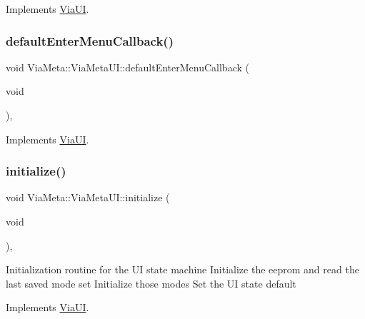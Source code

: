 Implements \mbox{\hyperlink{class_via_u_i_a8a6bf29d336faa8e9d026a84be45d956}{Via\+UI}}.

\mbox{\label{class_via_meta_1_1_via_meta_u_i_a632c291b811cf6e704e913060083dd7d}} 
\subsubsection{\texorpdfstring{default\+Enter\+Menu\+Callback()}{defaultEnterMenuCallback()}}
{\footnotesize\ttfamily void Via\+Meta\+::\+Via\+Meta\+U\+I\+::default\+Enter\+Menu\+Callback (\begin{DoxyParamCaption}\item[{void}]{ }\end{DoxyParamCaption})\hspace{0.3cm}{\ttfamily [override]}, {\ttfamily [virtual]}}



Implements \mbox{\hyperlink{class_via_u_i_a226eb7b65b6035a611dd734d965fa7c2}{Via\+UI}}.

\mbox{\label{class_via_meta_1_1_via_meta_u_i_ac2bc1bfeb6ef0045d234bd5b89f9ec99}} 
\subsubsection{\texorpdfstring{initialize()}{initialize()}}
{\footnotesize\ttfamily void Via\+Meta\+::\+Via\+Meta\+U\+I\+::initialize (\begin{DoxyParamCaption}\item[{void}]{ }\end{DoxyParamCaption})\hspace{0.3cm}{\ttfamily [override]}, {\ttfamily [virtual]}}

Initialization routine for the UI state machine Initialize the eeprom and read the last saved mode set Initialize those modes Set the UI state default 

Implements \mbox{\hyperlink{class_via_u_i_a573ba7aef8f4982ec4900258c770bdbb}{Via\+UI}}.

